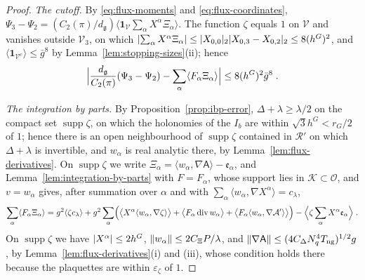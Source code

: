 \documentclass[11pt]{preprint}
\DeclarePairedDelimiter{\abs}{\lvert}{\rvert}
\DeclarePairedDelimiter{\norm}{\lVert}{\rVert}
\numberwithin{equation}{section}
\theoremstyle{definition}
\theoremstyle{remark}
\theoremstyle{plain}
\begin{document}
\begin{proof}
\emph{The cutoff.} By \eqref{eq:flux-moments} and \eqref{eq:flux-coordinates}, $\Psi_3 - \Psi_2 = (C_2(\pi)/d_{\mathfrak g})\langle\mathbf 1_{\mathcal V}\sum_\alpha X^\alpha\Xi_\alpha\rangle$. The function $\zeta$ equals $1$ on $\mathcal V$ and vanishes outside $\mathcal V_3$, on which $\abs{\sum_\alpha X^\alpha\Xi_\alpha} \leq \abs{X_{0,0}}_2\abs{X_{0,3} - X_{0,2}}_2 \leq 8(h^G)^2$, and $\langle\mathbf 1_{\mathcal V^c}\rangle \leq \bar g^8$ by Lemma~\ref{lem:stopping-sizes}(ii); hence
\begin{equation}\label{eq:moments-cutoff}
    \Bigl\lvert\frac{d_{\mathfrak g}}{C_2(\pi)}(\Psi_3 - \Psi_2) - \sum_\alpha\langle F_\alpha\Xi_\alpha\rangle\Bigr\rvert \leq 8(h^G)^2\bar g^8\;.
\end{equation}

\emph{The integration by parts.} By Proposition~\ref{prop:ibp-error}, $\Delta + \lambda \geq \lambda/2$ on the compact set $\operatorname{supp}\zeta$, on which the holonomies of the $I_b$ are within $\sqrt3h^G < r_G/2$ of $1$; hence there is an open neighbourhood of $\operatorname{supp}\zeta$ contained in $\mathcal R'$ on which $\Delta + \lambda$ is invertible, and $w_\alpha$ is real analytic there, by Lemma~\ref{lem:flux-derivatives}. On $\operatorname{supp}\zeta$ we write $\Xi_\alpha = \langle w_\alpha, \nabla\mathsf A\rangle - \mathfrak e_\alpha$, and Lemma~\ref{lem:integration-by-parts} with $F = F_\alpha$, whose support lies in $\mathcal K \subset \mathcal O$, and $v = w_\alpha$ gives, after summation over $\alpha$ and with $\sum_\alpha\langle w_\alpha, \nabla X^\alpha\rangle = c_\lambda$,
\begin{equation}\label{eq:moments-ibp}
    \sum_\alpha\langle F_\alpha\Xi_\alpha\rangle = g^2\langle\zeta c_\lambda\rangle + g^2\sum_\alpha\Bigl(\bigl\langle X^\alpha\langle w_\alpha, \nabla\zeta\rangle\bigr\rangle + \bigl\langle F_\alpha\operatorname{div}w_\alpha\bigr\rangle + \bigl\langle F_\alpha\langle w_\alpha, \nabla\mathcal A'\rangle\bigr\rangle\Bigr) - \Bigl\langle\zeta\sum_\alpha X^\alpha\mathfrak e_\alpha\Bigr\rangle\;.
\end{equation}
On $\operatorname{supp}\zeta$ we have $\abs{X^\alpha} \leq 2h^G$, $\norm{w_\alpha} \leq 2C_\Xi P/\lambda$, and $\norm{\nabla\mathsf A} \leq (4C_\Delta N_q^4T_{\mathrm{ng}})^{1/2}g$, by Lemma~\ref{lem:flux-derivatives}(i) and (iii), whose condition holds there because the plaquettes are within $\varepsilon_\zeta$ of $1$.


\end{proof}
\end{document}
